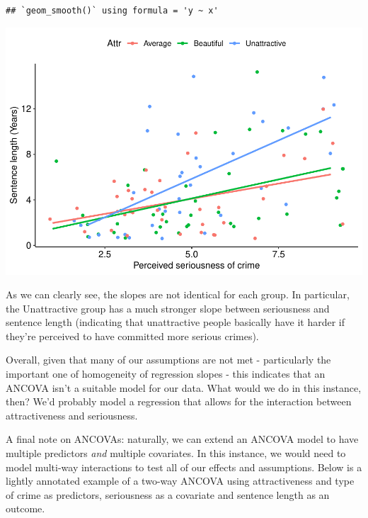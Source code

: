 \documentclass[
]{book}
\newenvironment{Shaded}{\begin{snugshade}}{\end{snugshade}}
\newcommand{\AttributeTok}[1]{\textcolor[rgb]{0.13,0.29,0.53}{#1}}
\newcommand{\CommentTok}[1]{\textcolor[rgb]{0.56,0.35,0.01}{\textit{#1}}}
\newcommand{\FunctionTok}[1]{\textcolor[rgb]{0.13,0.29,0.53}{\textbf{#1}}}
\newcommand{\NormalTok}[1]{#1}
\newcommand{\OtherTok}[1]{\textcolor[rgb]{0.56,0.35,0.01}{#1}}
\newcommand{\SpecialCharTok}[1]{\textcolor[rgb]{0.81,0.36,0.00}{\textbf{#1}}}
\begin{document}
\begin{verbatim}
## `geom_smooth()` using formula = 'y ~ x'
\end{verbatim}

\begin{center}\includegraphics{_main_files/figure-latex/unnamed-chunk-268-1} \end{center}

As we can clearly see, the slopes are not identical for each group. In particular, the Unattractive group has a much stronger slope between seriousness and sentence length (indicating that unattractive people basically have it harder if they're perceived to have committed more serious crimes).

Overall, given that many of our assumptions are not met - particularly the important one of homogeneity of regression slopes - this indicates that an ANCOVA isn't a suitable model for our data. What would we do in this instance, then? We'd probably model a regression that allows for the interaction between attractiveness and seriousness.

A final note on ANCOVAs: naturally, we can extend an ANCOVA model to have multiple predictors \emph{and} multiple covariates. In this instance, we would need to model multi-way interactions to test all of our effects and assumptions. Below is a lightly annotated example of a two-way ANCOVA using attractiveness and type of crime as predictors, seriousness as a covariate and sentence length as an outcome.

\begin{Shaded}
\end{Shaded}
\end{document}
